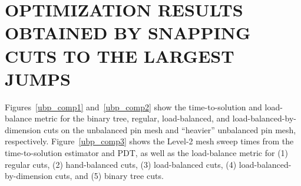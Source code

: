 %
%
%
%



\chapter{\uppercase{Optimization Results Obtained by snapping cuts to the largest jumps }}\label{appendix1}

Figures~\ref{ubp_comp1} and~\ref{ubp_comp2} show the time-to-solution and load-balance metric for the binary tree, regular, load-balanced, and load-balanced-by-dimension cuts on the unbalanced pin mesh and ``heavier'' unbalanced pin mesh, respectively.
Figure~\ref{ubp_comp3} shows the Level-2 mesh sweep times from the time-to-solution estimator and PDT, as well as the load-balance metric for (1) regular cuts, (2) hand-balanced cuts, (3) load-balanced cuts, (4) load-balanced-by-dimension cuts, and (5) binary tree cuts.

